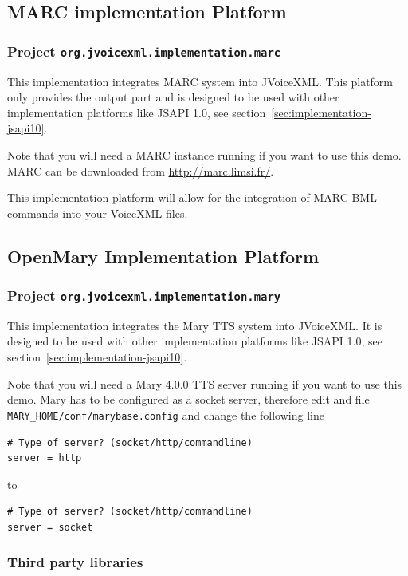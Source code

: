 \documentclass[11pt,a4paper]{article}
\begin{document}
\subsection{MARC implementation Platform}
\subsubsection{Project \texttt{org.jvoicexml.implementation.marc}}

This implementation integrates MARC system into JVoiceXML. This platform
only provides the output part and is designed to be used with other
implementation platforms like JSAPI 1.0, see section~\ref{sec:implementation-jsapi10}.

Note that you will need a MARC instance running if you want to use this
demo. MARC can be downloaded from \url{http://marc.limsi.fr/}.

This implementation platform will allow for the integration of MARC BML commands
into your VoiceXML files.

\subsection{OpenMary Implementation Platform}
\subsubsection{Project \texttt{org.jvoicexml.implementation.mary}}

This implementation integrates the Mary TTS system into JVoiceXML. It is
designed to be used with other implementation platforms like JSAPI 1.0, see
section~\ref{sec:implementation-jsapi10}.

Note that you will need a Mary 4.0.0  TTS server running if you want to use this
demo. Mary has to be configured as a socket server, therefore edit and file
\texttt{MARY\_HOME/conf/marybase.config} and change the following line 

\begin{lstlisting}
# Type of server? (socket/http/commandline)
server = http
\end{lstlisting}

to

\begin{lstlisting}
# Type of server? (socket/http/commandline)
server = socket
\end{lstlisting}

\subsubsection{Third party libraries}
\label{sec:mary-third-party-libr}
\end{document}
